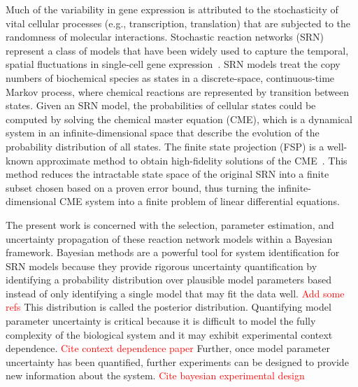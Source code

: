 \documentclass[1p]{article}
\begin{document}
Much of the variability in gene expression is attributed to the stochasticity of vital cellular processes (e.g., transcription, translation) that are subjected to the randomness of molecular interactions.
Stochastic reaction networks (SRN) represent a class of models that have been widely used to capture the temporal, spatial fluctuations in single-cell gene expression~\cite{Gillespie1992}.
SRN models treat the copy numbers of biochemical species as states in a discrete-space, continuous-time Markov process, where chemical reactions are represented by transition between states.
Given an SRN model, the probabilities of cellular states could be computed by solving the chemical master equation (CME), which is a dynamical system in an infinite-dimensional space that describe the evolution of the probability distribution of all states.
The finite state projection (FSP) is a well-known approximate method to obtain high-fidelity solutions of the CME~\cite{Munsky2006}.
This method reduces the intractable state space of the original SRN into a finite subset chosen based on a proven error bound, thus turning the infinite-dimensional CME system into a finite problem of linear differential equations.

The present work is concerned with the selection, parameter estimation, and uncertainty propagation of these reaction network models within a Bayesian framework.
 Bayesian methods are a powerful tool for system identification for SRN models because they provide rigorous uncertainty quantification by identifying a probability distribution over plausible model parameters based instead of only identifying a single model that may fit the data well. \textcolor{red}{Add some refs}
 This distribution is called the posterior distribution.
 Quantifying model parameter uncertainty is critical because it is difficult to model the fully complexity of the biological system and it may exhibit experimental context dependence. \textcolor{red}{Cite context dependence paper}
 Further, once model parameter uncertainty has been quantified, further experiments can be designed to provide new information about the system. \textcolor{red}{Cite bayesian experimental design}
\end{document}
